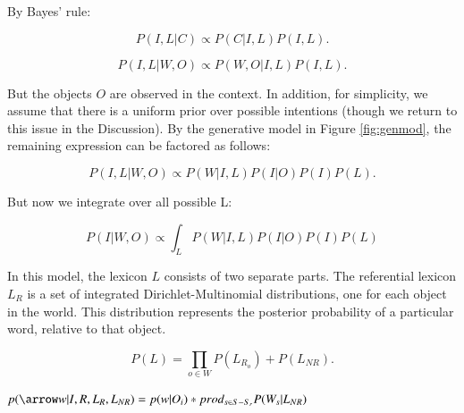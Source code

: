 \documentclass[man,noapacite]{apa2}
\begin{document}
By Bayes' rule:

\begin{equation}
P( I, L | C) \propto P(C | I, L ) P(I, L).
\end{equation}



\begin{equation}
P( I, L | W, O) \propto P(W, O | I, L) P(I, L).
\end{equation}


\noindent But the objects $O$ are observed in the context. In addition, for simplicity, we assume that there is a uniform prior over possible intentions (though we return to this issue in the Discussion). By the generative model in Figure \ref{fig:genmod}, the remaining expression can be factored as follows:

\begin{equation}
P( I, L | W, O) \propto P(W | I, L) P(I | O) P(I) P(L).
\end{equation}

But now we integrate over all possible L:

\begin{equation}
P( I| W, O) \propto \int_L{P(W | I, L) P(I | O) P(I)  P(L) }
\end{equation}


In this model, the lexicon $L$ consists of two separate parts. The referential lexicon $L_R$ is a set of integrated Dirichlet-Multinomial distributions, one for each object in the world. This distribution represents the posterior probability of a particular word, relative to that object. 

\begin{equation}
P(L) = \prod_{o \in W}{P(L_{R_o})} + P(L_{NR}).
\end{equation}

 



$p(\arrow w | I, R, L_R, L_{NR}) = p(w|O_i) * prod_{s \in S - S_r} {P(W_s | L_{NR})}$
\end{document}
